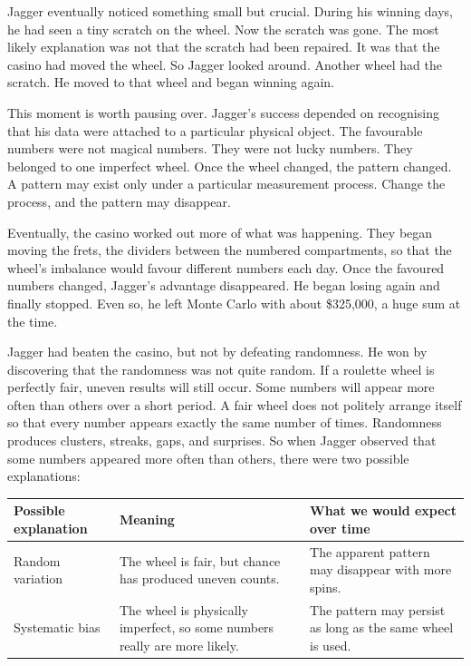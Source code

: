\documentclass[
  letterpaper,
  DIV=11,
  numbers=noendperiod]{scrreprt}
\begin{document}
\begin{tcolorbox}
Jagger eventually noticed something small but crucial. During his
winning days, he had seen a tiny scratch on the wheel. Now the scratch
was gone. The most likely explanation was not that the scratch had been
repaired. It was that the casino had moved the wheel. So Jagger looked
around. Another wheel had the scratch. He moved to that wheel and began
winning again.

This moment is worth pausing over. Jagger's success depended on
recognising that his data were attached to a particular physical object.
The favourable numbers were not magical numbers. They were not lucky
numbers. They belonged to one imperfect wheel. Once the wheel changed,
the pattern changed. A pattern may exist only under a particular
measurement process. Change the process, and the pattern may disappear.

Eventually, the casino worked out more of what was happening. They began
moving the frets, the dividers between the numbered compartments, so
that the wheel's imbalance would favour different numbers each day. Once
the favoured numbers changed, Jagger's advantage disappeared. He began
losing again and finally stopped. Even so, he left Monte Carlo with
about \$325,000, a huge sum at the time.

Jagger had beaten the casino, but not by defeating randomness. He won by
discovering that the randomness was not quite random. If a roulette
wheel is perfectly fair, uneven results will still occur. Some numbers
will appear more often than others over a short period. A fair wheel
does not politely arrange itself so that every number appears exactly
the same number of times. Randomness produces clusters, streaks, gaps,
and surprises. So when Jagger observed that some numbers appeared more
often than others, there were two possible explanations:

\begin{table}
\fontsize{12.0pt}{14.0pt}\selectfont
\begin{tabular*}{\linewidth}{@{\extracolsep{\fill}}lll}
\toprule
Possible explanation & Meaning & What we would expect over time \\ 
\midrule\addlinespace[2.5pt]
Random variation & The wheel is fair, but chance has produced uneven counts. & The apparent pattern may disappear with more spins. \\ 
Systematic bias & The wheel is physically imperfect, so some numbers really are more likely. & The pattern may persist as long as the same wheel is used. \\ 
\bottomrule
\end{tabular*}
\end{table}


\end{tcolorbox}
\end{document}
